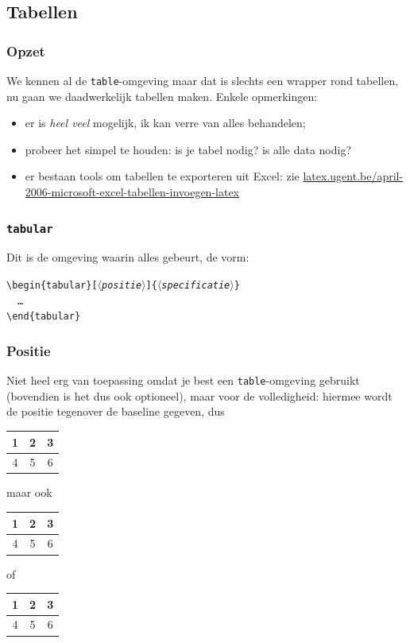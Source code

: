 \subsection{Tabellen}
\begin{frame}[fragile]
  \frametitle{Opzet}

  We kennen al de \verb|table|-omgeving maar dat is slechts een wrapper rond tabellen, nu gaan we daadwerkelijk tabellen maken. Enkele opmerkingen:
  \begin{itemize}
    \item er is \emph{heel veel} mogelijk, ik kan verre van alles behandelen;
    \item probeer het simpel te houden: is je tabel nodig? is alle data nodig?
    \item er bestaan tools om tabellen te exporteren uit Excel: zie \href{http://latex.ugent.be/april-2006-microsoft-excel-tabellen-invoegen-latex}{latex.ugent.be/april-2006-microsoft-excel-tabellen-invoegen-latex}
  \end{itemize}
\end{frame}

\begin{frame}
  \frametitle{\texttt{tabular}}

  Dit is de omgeving waarin alles gebeurt, de vorm:

  \texttt{\textcolor{uagreen}{\textbackslash begin}\{tabular\}[$\langle$\textsl{positie}$\rangle$]\{$\langle$\textsl{specificatie}$\rangle$\}} \\
  \ \ \texttt{\ldots} \\
  \texttt{\textcolor{uagreen}{\textbackslash end}\{tabular\}}
\end{frame}

\begin{frame}[fragile]
  \frametitle{Positie}

  Niet heel erg van toepassing omdat je best een \verb|table|-omgeving gebruikt (bovendien is het dus ook optioneel), maar voor de volledigheid: hiermee wordt de positie tegenover de baseline gegeven, dus
  \begin{tabular}[b]{ccc}
    1 & 2 & 3 \\\midrule
    4 & 5 & 6
  \end{tabular}
  maar ook
  \begin{tabular}[c]{ccc}
    1 & 2 & 3 \\\midrule
    4 & 5 & 6
  \end{tabular}
  of
  \begin{tabular}[t]{ccc}
    1 & 2 & 3 \\\midrule
    4 & 5 & 6
  \end{tabular}
\end{frame}

